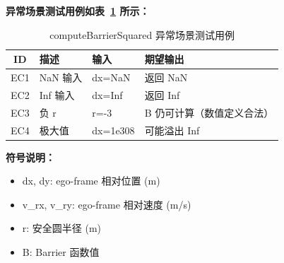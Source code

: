 \documentclass[a4paper,10pt]{article}
\begin{document}
\noindent\textbf{异常场景测试用例如表~\ref{tab:abnormal_computeBarrierSquared} 所示：}
\begin{table}[h]
\centering
\caption{computeBarrierSquared 异常场景测试用例}
\label{tab:abnormal_computeBarrierSquared}
\begin{tabular}{|c|p{3.5cm}|p{3.5cm}|p{3.5cm}|}
\hline
ID & 描述 & 输入 & 期望输出 \\ \hline
  EC1 & NaN 输入 & dx=NaN & 返回 NaN \\ \hline
  EC2 & Inf 输入 & dx=Inf & 返回 Inf \\ \hline
  EC3 & 负 r & r=-3 & B 仍可计算（数值定义合法） \\ \hline
  EC4 & 极大值 & dx=1e308 & 可能溢出 Inf \\ \hline
\end{tabular}
\end{table}

\noindent\textbf{符号说明：}
\begin{itemize}
  \item dx, dy: ego-frame 相对位置 (m)
  \item v\_rx, v\_ry: ego-frame 相对速度 (m/s)
  \item r: 安全圆半径 (m)
  \item B: Barrier 函数值
\end{itemize}
\end{document}

